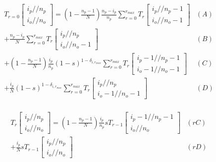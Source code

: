 \documentclass[preview]{standalone}
\newcommand{\Coalc}[4]{\begin{bmatrix}#1 /\!\!/ #2 \\ #3 /\!\!/ #4 \end{bmatrix}}
\begin{document}
\begin{equation*}
  \begin{aligned}
    T_{r=0}\Coalc{i_p}{n_p}{i_o}{n_o}
    = \left(1-\frac{n_p-1}{N}\right) \frac{n_p-i_p}{n_p}                              \sum_{r=0}^{r_{max}} T_{r}\Coalc{i_p  }{n_p-1}{i_o  }{n_o-1} & (A) \\
    +                                \frac{n_p-i_p}{N}                                \sum_{r=0}^{r_{max}} T_{r}\Coalc{i_p  }{n_p  }{i_o  }{n_o-1} & (B) \\
    + \left(1-\frac{n_p-1}{N}\right) \frac{i_p}{n_p}     (1-s)^{1-\delta_{i,r_{max}}} \sum_{r=0}^{r_{max}} T_{r}\Coalc{i_p-1}{n_p-1}{i_o-1}{n_o-1} & (C) \\
    +                                \frac{i_p}{N}       (1-s)^{1-\delta_{i,r_{max}}} \sum_{r=0}^{r_{max}} T_{r}\Coalc{i_p  }{n_p  }{i_o-1}{n_o-1} & (D) \\
  \end{aligned}
\end{equation*}

\begin{equation*}
  \begin{aligned}
    T_{r}\Coalc{i_p}{n_p}{i_o}{n_o}
    = \left(1-\frac{n_p-1}{N}\right) \frac{i_p}{n_p} s T_{r-1} \Coalc{i_p-1}{n_p-1}{i_o}{n_o}& (rC) \\
    +                                \frac{i_p}{N}   s T_{r-1} \Coalc{i_p  }{n_p  }{i_o}{n_o}& (rD) \\
  \end{aligned}
\end{equation*}
\end{document}
